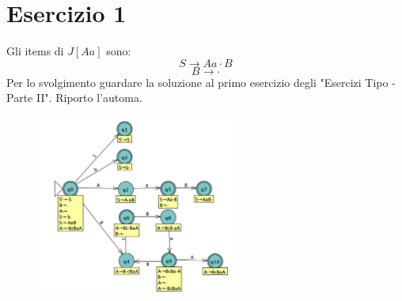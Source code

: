 \documentclass[11pt]{article}
\begin{document}
\section*{Esercizio 1}
Gli items di $J[Aa]$ sono: 
$$S \rightarrow Aa\cdot B$$
$$B \rightarrow \cdot$$
Per lo svolgimento guardare la soluzione al primo esercizio degli "Esercizi Tipo - Parte II".
Riporto l'automa.

\hypertarget{automa_1}{}
\begin{figure}[H]
\centering
  \includegraphics[width=0.6\textwidth]{../2/img/01AutomaSRL.png}
  \label{fig:01-automa}
\end{figure}
\end{document}
